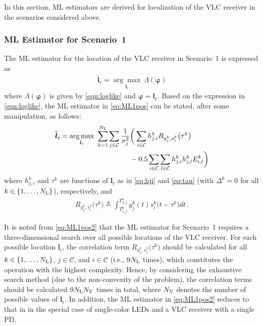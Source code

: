 \documentclass[10pt,twocolumn]{IEEEtran}
\newcommand{\NL}{N_{\rm{L}}}
\newcommand{\NV}{N_{\rm{V}}}
\newcommand{\bvp}{{\boldsymbol{\varphi}}}
\newcommand{\mtC}{{\mathcal{C}}}
\newcommand{\lr}{{\boldsymbol{l}_{\mathrm{r}}}}
\newcommand{\lrh}{{\widehat{\boldsymbol{l}}_{\mathrm{r}}}}
\begin{document}
In this section, ML estimators are derived for localization of the VLC receiver in the scenarios considered above.

\subsubsection{ML Estimator for Scenario~1}\label{sec:ML1pos}

The ML estimator for the location of the VLC receiver in Scenario~1 is expressed as
\begin{gather}\label{eq:ML1pos}
\lrh=\underset{\lr}{\arg\max}~\Lambda(\bvp)
\end{gather}
where $\Lambda(\bvp)$ is given by \eqref{eqn:loglike} and $\bvp=\lr$. Based on the expression in \eqref{eqn:loglike}, the ML estimator in \eqref{eq:ML1pos} can be stated, after some manipulation, as follows:
\begin{align}\nonumber
\lrh=\underset{\lr}{\arg\max}~\sum_{k=1}^{\NL}\sum_{j\in{\mtC}}\frac{1}{\sigma_j^2}
&\bigg(
\sum_{i\in{\mtC}}h^k_{j,i}R_{y^k_j,s^k_i}\big(\tau^k\big)
\\\label{eq:ML1pos2}
&-0.5\sum_{i\in{\mtC}}\sum_{l\in{\mtC}}h^k_{j,i}h^k_{j,l}E^k_{i,l}
\bigg)
\end{align}
where $h^k_{j,i}$ and $\tau^k$ are functions of $\lr$ as in \eqref{eq:hji} and \eqref{eq:tau} (with $\Delta^k=0$ for all $k\in\{1,\ldots,\NL\}$), respectively, and
\begin{gather}\label{eq:RysPos}
R_{y^k_j,s^k_i}\big(\tau^k\big)\triangleq \int_{T^k_{1,j}}^{T^k_{2,j}}y^k_j(t)s^k_i\big(t-\tau^k\big)dt\,.
\end{gather}

It is noted from \eqref{eq:ML1pos2} that the ML estimator for Scenario~1 requires a three-dimensional search over all possible locations of the VLC receiver. For each possible location $\lr$, the correlation term $R_{y^k_j,s^k_i}\big(\tau^k\big)$ should be calculated for all $k\in\{1,\ldots,\NL\}$, $j\in\mtC$, and $i\in\mtC$ (i.e., $9\NL$ times), which constitutes the operation with the highest complexity. Hence, by considering the exhaustive search method (due to the non-convexity of the problem), the correlation terms should be calculated $9\NL\NV$ times in total, where $\NV$ denotes the number of possible values of $\lr$.
In addition, the ML estimator in \eqref{eq:ML1pos2} reduces to that in \cite[eqn.~(19)]{Direct_TCOM} in the special case of single-color LEDs and a VLC receiver with a single PD.
\end{document}
